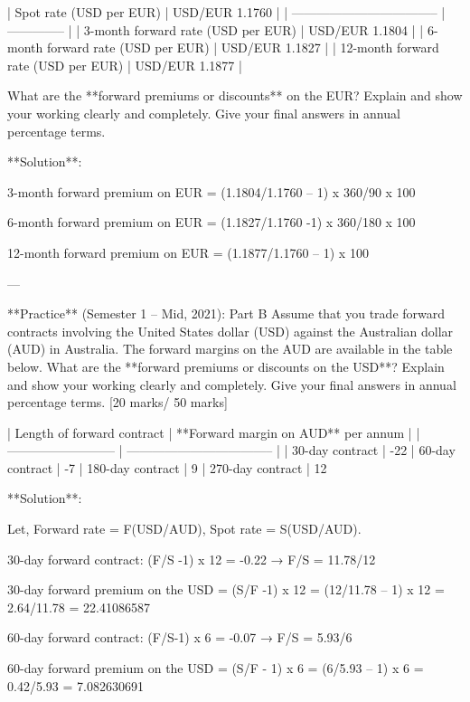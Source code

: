 \documentclass{article}
\begin{document}
| Spot rate (USD per EUR)             | USD/EUR 1.1760 |
| ----------------------------------- | -------------- |
| 3-month forward rate (USD per EUR)  | USD/EUR 1.1804 |
| 6-month forward rate (USD per EUR)  | USD/EUR 1.1827 |
| 12-month forward rate (USD per EUR) | USD/EUR 1.1877 |

What are the **forward premiums or discounts** on the EUR? Explain and show your working clearly and completely. Give your final answers in annual percentage terms.

**Solution**:

3-month forward premium on EUR = (1.1804/1.1760 – 1) x 360/90 x 100 %

6-month forward premium on EUR = (1.1827/1.1760 -1) x 360/180 x 100 %

12-month forward premium on EUR = (1.1877/1.1760 – 1) x 100%

---

**Practice** (Semester 1 -- Mid, 2021): Part B Assume that you trade forward contracts involving the United States dollar (USD) against the Australian dollar (AUD) in Australia. The forward margins on the AUD are available in the table below. What are the **forward premiums or discounts on the USD**? Explain and show your working clearly and completely. Give your final answers in annual percentage terms. [20 marks/ 50 marks]

| Length of forward contract | **Forward margin on AUD** per annum |
| -------------------------- | ----------------------------------- |
| 30-day contract            | -22%
| 60-day contract            | -7%
| 180-day contract           | 9%
| 270-day contract           | 12%

**Solution**:

Let, Forward rate = F(USD/AUD), Spot rate = S(USD/AUD).

30-day forward contract: (F/S -1) x 12 = -0.22 → F/S = 11.78/12

30-day forward premium on the USD = (S/F -1) x 12 = (12/11.78 – 1) x 12 = 2.64/11.78 = 22.41086587 %

60-day forward contract: (F/S-1) x 6 = -0.07 → F/S = 5.93/6

60-day forward premium on the USD = (S/F - 1) x 6 = (6/5.93 – 1) x 6 = 0.42/5.93 = 7.082630691 %
\end{document}
